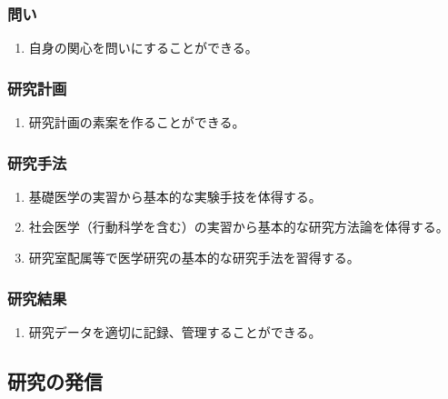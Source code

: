\hypertarget{ux554fux3044}{%
\subsubsection{問い}\label{ux554fux3044}}

\begin{enumerate}
\def\labelenumi{\arabic{enumi}.}
\tightlist
\item
  自身の関心を問いにすることができる。
\end{enumerate}

\hypertarget{ux7814ux7a76ux8a08ux753b}{%
\subsubsection{研究計画}\label{ux7814ux7a76ux8a08ux753b}}

\begin{enumerate}
\def\labelenumi{\arabic{enumi}.}
\tightlist
\item
  研究計画の素案を作ることができる。
\end{enumerate}

\hypertarget{ux7814ux7a76ux624bux6cd5}{%
\subsubsection{研究手法}\label{ux7814ux7a76ux624bux6cd5}}

\begin{enumerate}
\def\labelenumi{\arabic{enumi}.}
\tightlist
\item
  基礎医学の実習から基本的な実験手技を体得する。
\item
  社会医学（行動科学を含む）の実習から基本的な研究方法論を体得する。
\item
  研究室配属等で医学研究の基本的な研究手法を習得する。
\end{enumerate}

\hypertarget{ux7814ux7a76ux7d50ux679c}{%
\subsubsection{研究結果}\label{ux7814ux7a76ux7d50ux679c}}

\begin{enumerate}
\def\labelenumi{\arabic{enumi}.}
\tightlist
\item
  研究データを適切に記録、管理することができる。
\end{enumerate}

\hypertarget{ux7814ux7a76ux306eux767aux4fe1}{%
\subsection{研究の発信}\label{ux7814ux7a76ux306eux767aux4fe1}}

